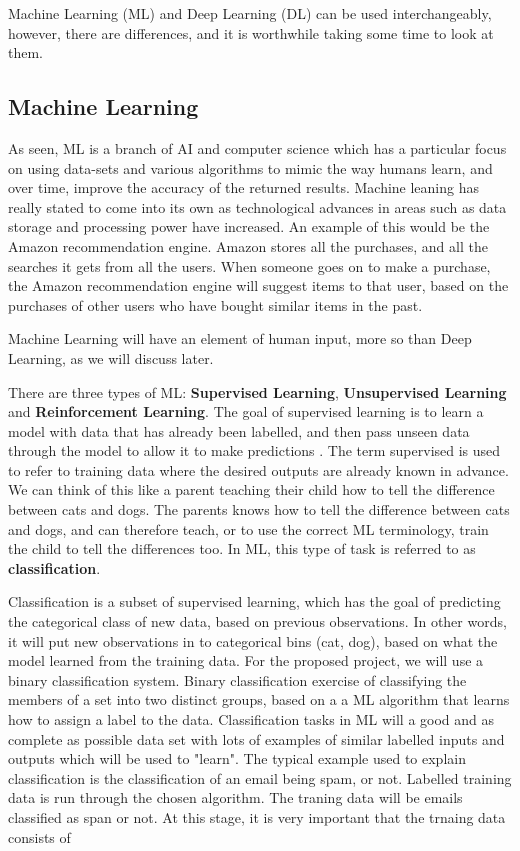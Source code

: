 \documentclass[conference]{IEEEtran}
\begin{document}
Machine Learning (ML) and Deep Learning (DL) can be used interchangeably, however, there are differences, and it is worthwhile taking some time to look at them. 

\subsection{Machine Learning}
As seen, ML is a branch of AI and computer science which has a particular focus on using data-sets and various algorithms to mimic the way humans learn, and over time, improve the accuracy of the returned results. Machine leaning has really stated to come into its own as technological advances in areas such as data storage and processing power have increased. An example of this would be the Amazon recommendation engine. Amazon stores all the purchases, and all the searches it gets from all the users. When someone goes on to make a purchase, the Amazon recommendation engine will suggest items to that user, based on the purchases of other users who have bought similar items in the past.

Machine Learning will have an element of human input, more so than Deep Learning, as we will discuss later.

There are three types of ML: \textbf{Supervised Learning}, \textbf{Unsupervised Learning} and \textbf{Reinforcement Learning}. The goal of supervised learning is to learn a model with data that has already been labelled, and then pass unseen data through the model to allow it to make predictions \cite{pythonML}. The term supervised is used to refer to training data where the desired outputs are already known in advance. We can think of this like a parent teaching their child how to tell the difference between cats and dogs. The parents knows how to tell the difference between cats and dogs, and can therefore teach, or to use the correct ML terminology, train the child to tell the differences too. In ML, this type of task is referred to as \textbf{classification}.

Classification is a subset of supervised learning, which has the goal of predicting the categorical class of new data, based on previous observations. In other words, it will put new observations in to categorical bins (cat, dog), based on what the model learned from the training data. For the proposed project, we will use a binary classification system. Binary classification exercise of classifying the members of a set into two distinct groups, based on a a ML algorithm that learns how to assign a label to the data. Classification tasks in ML will a good and as complete as possible data set with lots of examples of similar labelled inputs and outputs which will be used to "learn". The typical example used to explain classification is the classification of an email being spam, or not. Labelled training data is run through the chosen algorithm. The traning data will be emails classified as span or not. At this stage, it is very important that the trnaing data consists of 
\end{document}
